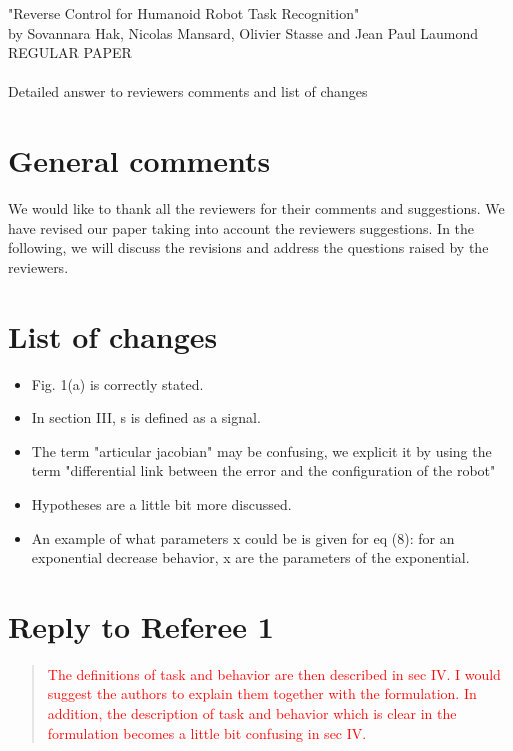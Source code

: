 \documentclass[11pt]{article}
\newcommand{\red}[1]{{\textcolor{red}{#1}}}
\begin{document}
\begin{center}
  {\large "Reverse Control for Humanoid Robot Task Recognition" \\
  \small by Sovannara Hak, Nicolas Mansard, Olivier Stasse and Jean Paul Laumond\\
  \small REGULAR PAPER \\
  ~ \\
  \large Detailed answer to reviewers comments and list of changes\\}
\end{center}


\section{General comments}
We would like to thank all the reviewers for their comments and suggestions.
We have revised	our paper taking into account the reviewers suggestions.
In the following, we will discuss the revisions and address the questions raised by the reviewers.

\section{List of changes}
\begin{itemize}
 \item Fig. 1(a) is correctly stated.
 \item In section III, s is defined as a signal.
 \item The term "articular jacobian" may be confusing, we explicit it
 by using the term "differential link between the error and the configuration of the robot"
 \item Hypotheses are a little bit more discussed.
 \item An example of what parameters x could be is given for eq (8): for an exponential decrease
 behavior, x are the parameters of the exponential.

\end{itemize}

\section{Reply to Referee 1}
\begin{quote}
  \red{The definitions of task and behavior are then described in sec IV.  I would suggest the authors to explain them together with the formulation.  In addition, the description of task and behavior which is clear in the formulation becomes a little bit confusing in sec IV.}
\end{quote}
\end{document}
